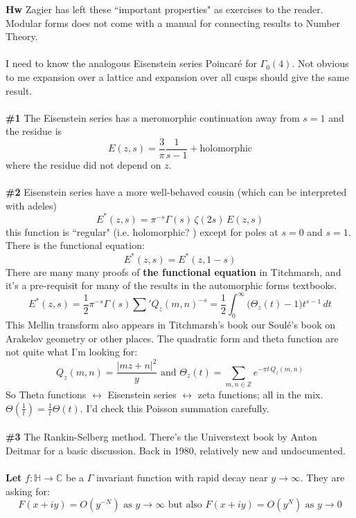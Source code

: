 \documentclass[12pt]{article}
\begin{document}
\newpage

\noindent \textbf{Hw} Zagier has left these ``important properties" as exercises to the reader.  \\ 
Modular forms does not come with a manual for connecting results to Number Theory. \\ \\
I need to know the analogous Eisenstein series Poincar\'{e} for $\Gamma_0(4)$.  Not obvious to me expansion over a lattice and expansion over all cusps should give the same result.\\ \\
\textbf{\#1} The Eisenstein series has a meromorphic continuation away from $s = 1$ and the residue is
$$ E(z,s) = \frac{3}{\pi} \frac{1}{s-1} + \text{holomorphic} $$
where the residue did not depend on $z$.  \\ \\
\textbf{\#2} Eisenstein series have a more well-behaved cousin (which can be interpreted with adeles)
$$ E^*(z,s) = \pi^{-s} \Gamma(s) \, \zeta(2s) \, E(z,s) $$
this function is ``regular" (i.e. holomorphic? ) except for poles at $s=0$ and $s=1$.  There is {\color{red}the functional equation}:
$$E^*(z,s) = E^*(z,1-s) $$
There are many many proofs of \textbf{the functional equation} in Titchmarsh, and it's a pre-requisit for many of the results in the automorphic forms textbooks.
$$ E^*(z,s) = \frac{1}{2} \pi^{-s} \Gamma(s) \sum' Q_z(m,n)^{-s} = \frac{1}{2} \int_0^\infty \big( \Theta_z(t) - 1 \big)  t^{s-1} \, dt $$
This Mellin transform also appears in Titchmarsh's book our Soul\'{e}'s book on Arakelov geometry or other places.  The quadratic form and theta function are not quite what I'm looking for:
$$ Q_z(m,n) = \frac{|m z + n|^2}{y} \text{ and } \Theta_z(t) = \sum_{m, n \in \mathbb{Z}} e^{ -\pi t \,  Q_z(m,n)}$$
So Theta functions $\leftrightarrow$ Eisenstein series $\leftrightarrow$ zeta functions; all in the mix. $\Theta(\frac{1}{t}) = \frac{1}{t} \Theta(t)$.  I'd check this Poisson summation carefully. \\ \\
\textbf{\#3} The Rankin-Selberg method.  There's the Universtext book by Anton Deitmar for a basic discussion.  Back in 1980, relatively new and undocumented.  \\ \\
\textbf{Let} $f: \mathbb{H} \to \mathbb{C} $ be a $\Gamma$ invariant function with rapid decay near $y \to \infty$.  They are asking for:
$$ F(x + iy) = O( y^{-N} ) \text{ as }y \to \infty
\text{ but also } F(x+iy) = O ( y^N)\text{ as }y \to 0$$
\end{document}
